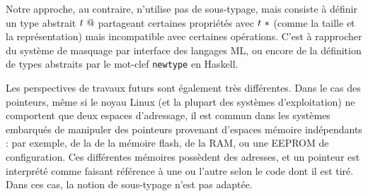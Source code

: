 Notre approche, au contraire, n'utilise pas de sous-typage, mais consiste à
définir un type abstrait $t~@$ partageant certaines propriétés avec
$t~*$ (comme la taille et la représentation) mais incompatible avec
certaines opérations. C'est à rapprocher du système de masquage par interface
des langages ML, ou encore de la définition de types abstraits par le mot-clef
\texttt{newtype} en Haskell.

Les perspectives de travaux futurs sont également très différentes. Dans le cas
des pointeurs, même si le noyau Linux (et la plupart des systèmes
d'exploitation) ne comportent que deux espaces d'adressage, il est commun dans
les systèmes embarqués de manipuler des pointeurs provenant d'espaces mémoire
indépendants : par exemple, de la de la mémoire flash, de la RAM, ou une EEPROM
de configuration. Ces différentes mémoires possèdent des adresses, et un
pointeur est interprété comme faisant référence à une ou l'autre selon le code
dont il est tiré. Dans ces cas, la notion de sous-typage n'est pas adaptée.

